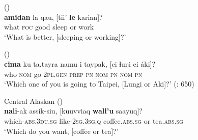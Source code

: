 \ea%
    \label{ex:4:51}
     ()\\
    \gll \textbf{{amidan}} la qau, [{tii’} \textbf{{le}} karian]?\\
    what    \textsc{foc}  good  sleep  or  work\\
    \glt ‘What is better, [sleeping or working]?’ \citep[284]{Klamer2010}
    \z

\ea%
    \label{ex:4:52}
     ()\\
    \gll \textbf{{cima}} ku  ta.tayra  namu    i  taypak, [ci  ɬuŋi  ci  áki]?\\
    who  \textsc{nom}  go    2\textsc{pl.gen}  \textsc{prep}  \textsc{pn} \textsc{nom}  \textsc{pn}  \textsc{nom}  \textsc{pn}\\
    \glt ‘Which one of you is going to Taipei, [Lungi or Aki]?’ (\citealt{Huang1999}: 650)
    \z

\ea%
    \label{ex:4:53}
    Central Alaskan  ()\\
    \gll \textbf{nali}-ak      assik-siu, [{kuuvviaq} \textbf{{wall’u}} saayuq]?\\
    which-\textsc{abs}.3\textsc{du.sg}  like-\textsc{2sg.3sg.q}    coffee.\textsc{abs.sg}  or  tea.\textsc{abs.sg}\\
    \glt ‘Which do you want, [coffee or tea]?’ \citep[170]{Miyaoka2012}
    \z

